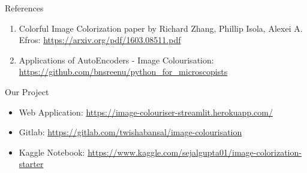 \documentclass[12pt]{beamer}
\begin{document}
\begin{frame}{References}
	\begin{enumerate}
		\item Colorful Image Colorization paper by Richard Zhang, Phillip Isola, Alexei A. Efros: \textcolor{cyan}{\href{https://arxiv.org/pdf/1603.08511.pdf}{https://arxiv.org/pdf/1603.08511.pdf}}
		\item Applications of AutoEncoders - Image Colourisation: \textcolor{cyan}{\href{https://github.com/bnsreenu/python\_for\_microscopists}{https://github.com/bnsreenu/python\_for\_microscopists}}
	\end{enumerate}
\end{frame}

\begin{frame}{Our Project}
	\begin{itemize}
		\item Web Application: \textcolor{cyan}{\href{https://image-colouriser-streamlit.herokuapp.com/}{https://image-colouriser-streamlit.herokuapp.com/}}
		\item Gitlab: \textcolor{cyan}{\href{https://gitlab.com/twishabansal/image-colourisation}{https://gitlab.com/twishabansal/image-colourisation}}
		\item Kaggle Notebook: \textcolor{cyan}{\href{https://www.kaggle.com/sejalgupta01/image-colorization-starter}{https://www.kaggle.com/sejalgupta01/image-colorization-starter}}
	\end{itemize}
\end{frame}

\begin{frame}[standout]
\end{frame}
\end{document}

